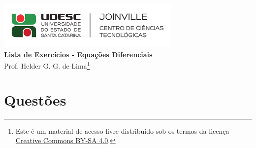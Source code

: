 \documentclass[12pt,a4paper]{article}
\author{\eu}
\title{\tipo}
\date{\data}
\newcommand{\IconPc}{\texttt{[image: computer.png]}}
\newcommand{\IconCalc}{\texttt{[image: calculator.png]}}
\newcommand{\IconThink}{\texttt{[image: pencil.png]}}
\newcommand{\IconCheck}{\texttt{[image: checkmark.png]}}
\newlength{\SmileysLength}
\newcommand{\calc}{\hspace*{-\SmileysLength}\makebox[0pt][r]{\IconCalc}%
   \hspace*{\SmileysLength}}
\newcommand{\software}{\hspace*{-\SmileysLength}\makebox[0pt][r]{\IconPc}%
   \hspace*{\SmileysLength}}
\newcommand{\teoria}{\hspace*{-\SmileysLength}\makebox[0pt][r]{\IconThink}%
   \hspace*{\SmileysLength}}
\newcommand{\conceito}{\hspace*{-\SmileysLength}\makebox[0pt][r]{\IconCheck}%
   \hspace*{\SmileysLength}}
\newcommand*\tipo{Lista de Exercícios - Equações Diferenciais}
\newcommand*\eu{Helder G. G. de Lima}
\begin{document}
\begin{center}
\includegraphics[width=9.0cm]{marca} \\
\textbf{\tipo} \\
Prof. \eu\footnote{
Este é um material de acesso livre distribuído sob os termos da licença \href{https://creativecommons.org/licenses/by-sa/4.0/deed.pt_BR}{Creative Commons BY-SA 4.0}.}
\end{center}


\section*{Questões}
\end{document}
